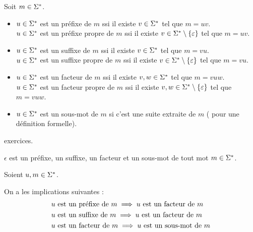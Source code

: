 \begin{defi}
Soit \(m\in\Sigma^{*}\).

\begin{itemize}
    \item \(u\in\Sigma^{*}\) est un préfixe de \(m\) ssi il existe \(v\in\Sigma^{*}\) tel que \(m=uv\). \\ \(u\in\Sigma^{*}\) est un préfixe propre de \(m\) ssi il existe \(v\in\Sigma^{*}\setminus\left\lbrace\varepsilon\right\rbrace\) tel que \(m=uv\). \\
    \item \(u\in\Sigma^{*}\) est un suffixe de \(m\) ssi il existe \(v\in\Sigma^{*}\) tel que \(m=vu\). \\ \(u\in\Sigma^{*}\) est un suffixe propre de \(m\) ssi il existe \(v\in\Sigma^{*}\setminus\left\lbrace\varepsilon\right\rbrace\) tel que \(m=vu\). \\
    \item \(u\in\Sigma^{*}\) est un facteur de \(m\) ssi il existe \(v,w\in\Sigma^{*}\) tel que \(m=vuw\). \\ \(u\in\Sigma^{*}\) est un facteur propre de \(m\) ssi il existe \(v,w\in\Sigma^{*}\setminus\left\lbrace\varepsilon\right\rbrace\) tel que \(m=vuw\). \\
    \item \(u\in\Sigma^{*}\) est un sous-mot de \(m\) si c'est une suite extraite de \(m\) (\cf {} pour une définition formelle). \\
\end{itemize}
\end{defi}

\begin{ex}
\Cf exercices.
\end{ex}

\begin{rem}
\(\epsilon\) est un préfixe, un suffixe, un facteur et un sous-mot de tout mot \(m\in\Sigma^{*}\).
\end{rem}

\begin{rem}
Soient \(u,m\in\Sigma^{*}\).

On a les implications suivantes : \[\begin{aligned}
&u\text{ est un préfixe de }m\implies u\text{ est un facteur de }m \\
&u\text{ est un suffixe de }m\implies u\text{ est un facteur de }m \\
&u\text{ est un facteur de }m\implies u\text{ est un sous-mot de }m \\
\end{aligned}\]
\end{rem}

